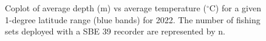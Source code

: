 \documentclass[12pt]{article}\usepackage[]{graphicx}\usepackage[]{color}
\begin{document}
\begin{figure}[htb]

{\centering {} 

}

\caption{Coplot of average depth (m) vs average temperature (\(^\circ\)C) for a given 1-degree latitude range (blue bands) for 2022. The number of fishing sets deployed with a SBE 39 recorder are represented by n.}\label{fig:figure17}
\end{figure}
\clearpage
\end{document}
